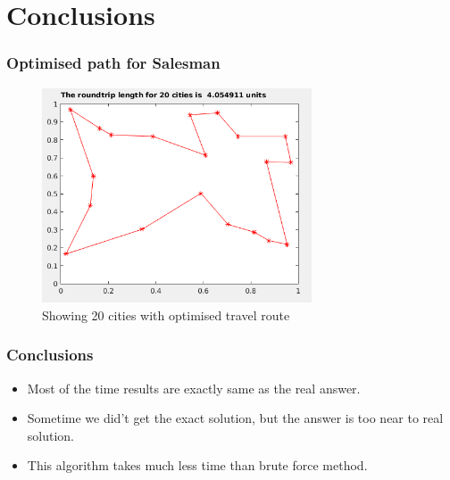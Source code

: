 \documentclass{beamer}
\begin{document}
\section{Conclusions}
\begin{frame}
    \frametitle{Optimised path for Salesman}
     \begin{figure}[t]
        \includegraphics[width = 8cm]{optimisedcity}
        \caption{Showing 20 cities with optimised travel route}
        \centering
    \end{figure}
\end{frame}

\begin{frame}
    \frametitle{Conclusions}
    \begin{itemize}
        \item Most of the time results are exactly same as the real answer.
        \item Sometime we did't get the exact solution, but the answer is too near to real solution.
        \item This algorithm takes much less time than brute force method.
    \end{itemize}
\end{frame}
\end{document}
